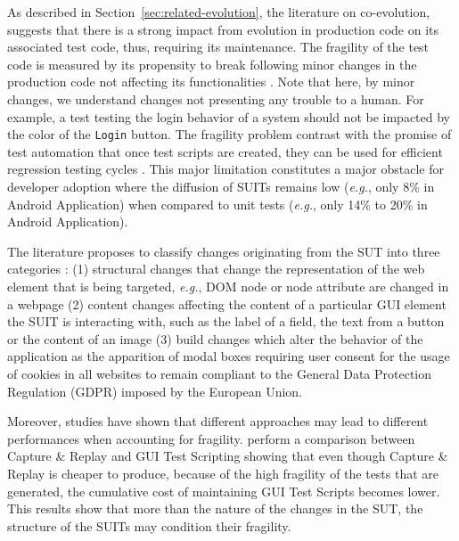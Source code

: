 As described in Section~\ref{sec:related-evolution}, the literature on co-evolution, suggests that there is a strong impact from evolution in production code on its associated test code, thus, requiring its maintenance. The fragility of the test code is measured by its propensity to break following minor changes in the production code not affecting its functionalities \cite{Garousi2016, Coppola2019}. Note that here, by minor changes, we understand changes not presenting any trouble to a human. For example, a test testing the login behavior of a system should not be impacted by the color of the \texttt{Login} button. The fragility problem contrast with the promise of test automation that once test scripts are created, they can be used for efficient regression testing cycles \cite{Yandrapally2014}. This major limitation constitutes a major obstacle for developer adoption where the diffusion of SUITs remains low (\emph{e.g.}, only 8\% \cite{Coppola2017, Coppola2019b} in Android Application) when compared to unit tests (\emph{e.g.}, only 14\% \cite{Kochhar2015} to 20\% \cite{Coppola2017, Coppola2019b} in Android Application).

The literature proposes to classify changes originating from the SUT into three categories \cite{Choudhary2011, Yandrapally2014, Coppola2016}: (1) structural changes that change the representation of the web element that is being targeted, \emph{e.g.}, DOM node or node attribute are changed in a webpage (2) content changes affecting the content of a particular GUI element the SUIT is interacting with, such as the label of a field, the text from a button or the content of an image (3) build changes which alter the behavior of the application as the apparition of modal boxes requiring user consent for the usage of cookies in all websites to remain compliant to the General Data Protection Regulation (GDPR) imposed by the European Union.

Moreover, studies have shown that different approaches may lead to different performances when accounting for fragility. \textcite{Leotta2013, Leotta2014} perform a comparison between Capture \& Replay and GUI Test Scripting showing that even though Capture \& Replay is cheaper to produce, because of the high fragility of the tests that are generated, the cumulative cost of maintaining GUI Test Scripts becomes lower. This results show that more than the nature of the changes in the SUT, the structure of the SUITs may condition their fragility. 

